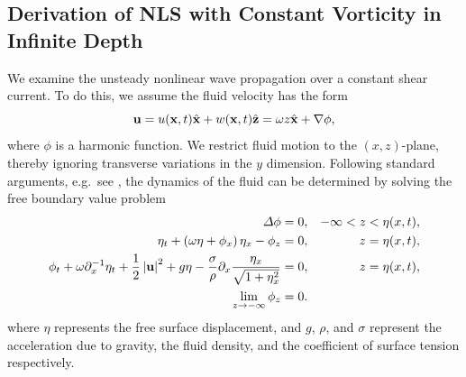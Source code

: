 \documentclass{JFM_Style/jfm}
\newcommand{\pd}{\partial}
\begin{document}
\subsection{Derivation of NLS with Constant Vorticity in Infinite Depth}
We examine the unsteady nonlinear wave propagation over a constant shear current.  To do this, we assume the fluid velocity has the form
\[
{\bf u} = u({\bf x},t)\hat{{\bf x}} + w({\bf x},t)\hat{{\bf z}} = \omega z\hat{{\bf x}} + \nabla \phi, 
\]
where $\phi$ is a harmonic function.  We restrict fluid motion to the $(x,z)$-plane, thereby ignoring transverse variations in the $y$ dimension.   Following standard arguments, e.g.~see \cite{ashton}, the dynamics of the fluid can be determined by solving the free boundary value problem
\begin{align}
\Delta \phi = 0, & & -\infty< z < \eta(x,t), \nonumber \\
\eta_{t} +\left(\omega\eta+\phi_{x}\right)\eta_{x} - \phi_{z} = 0, & & z=\eta(x,t), \label{kine}\\
\phi_{t} + \omega\pd_{x}^{-1}\eta_{t} + \frac{1}{2} \left|{\bf
    u}\right|^{2} + g\eta -
\frac{\sigma}{\rho}\pd_{x}\frac{\eta_{x}}{\sqrt{1+\eta_{x}^{2}}}= 0, &
& z=\eta(x,t), \label{bernou}\\
\lim_{z\rightarrow -\infty} \phi_{z} = 0. \nonumber
\end{align}
where $\eta$ represents the free surface displacement, and $g$, $\rho$, and $\sigma$ represent the acceleration due to gravity, the fluid density, and the coefficient of surface tension respectively.
\end{document}

